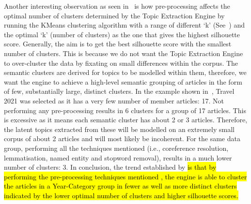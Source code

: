 \vspace*{-1.5em}
Another interesting observation as seen in~ is how pre-processing affects the optimal number of clusters determined by the Topic Extraction Engine by running the KMeans clustering algorithm with a range of different `k' (See~) and the optimal `k' (number of clusters) as the one that gives the highest silhouette score. Generally, the aim is to get the best silhouette score with the smallest number of clusters. This is because we do not want the Topic Extraction Engine to over-cluster the data by fixating on small differences within the corpus. The semantic clusters are derived for topics to be modelled within them, therefore, we want the engine to achieve a high-level semantic grouping of articles in the form of few, substantially large, distinct clusters. In the example shown in~, Travel 2021 was selected as it has a very few number of member articles: 17. Not performing any pre-processing results in 6 clusters for a group of 17 articles. This is excessive as it means each semantic cluster has about 2 or 3 articles. Therefore, the latent topics extracted from these will be modelled on an extremely small corpus of about 2 articles and will most likely be incoherent. For the same data group, performing all the techniques mentioned (i.e., coreference resolution, lemmatisation, named entity and stopword removal), results in a much lower number of clusters: 3. In conclusion, the trend established by  \hl{is that by performing the pre-processing techniques mentioned , the engine is able to cluster the articles in a Year-Category group in fewer as well as more distinct clusters indicated by the lower optimal number of clusters and higher silhouette scores.}


